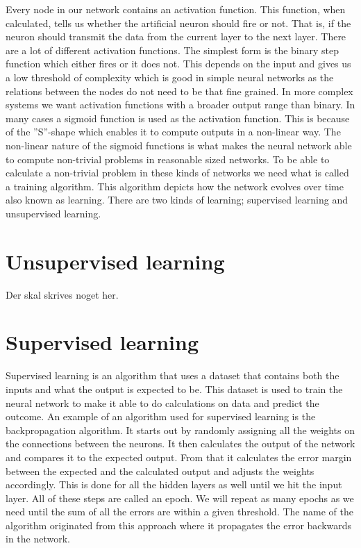 Every node in our network contains an activation function. This function, when calculated, tells us whether the artificial neuron should fire or not. That is, if the neuron should transmit the data from the current layer to the next layer. There are a lot of different activation functions. The simplest form is the binary step function which either fires or it does not. This depends on the input and gives us a low threshold of complexity which is good in simple neural networks as the relations between the nodes do not need to be that fine grained. In more complex systems we want activation functions with a broader output range than binary. In many cases a sigmoid function is used as the activation function. This is because of the ''S''-shape which enables it to compute outputs in a non-linear way. The non-linear nature of the sigmoid functions is what makes the neural network able to compute non-trivial problems in reasonable sized networks. To be able to calculate a non-trivial problem in these kinds of networks we need what is called a training algorithm. This algorithm depicts how the network evolves over time also known as learning. There are two kinds of learning; supervised learning and unsupervised learning.

\section{Unsupervised learning}
Der skal skrives noget her.

\section{Supervised learning}
Supervised learning is an algorithm that uses a dataset that contains both the inputs and what the output is expected to be. This dataset is used to train the neural network to make it able to do calculations on data and predict the outcome. An example of an algorithm used for supervised learning is the backpropagation algorithm. 
It starts out by randomly assigning all the weights on the connections between the neurons. It then calculates the output of the network and compares it to the expected output. From that it calculates the error margin between the expected and the calculated output and adjusts the weights accordingly. This is done for all the hidden layers as well until we hit the input layer. All of these steps are called an epoch. We will repeat as many epochs as we need until the sum of all the errors are within a given threshold. The name of the algorithm originated from this approach where it propagates the error backwards in the network.

